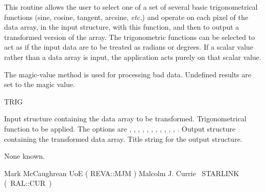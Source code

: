{
\begin{manroutinedescription}
  This routine allows the user to select one of a set of several
  basic trigonometrical functions (sine, cosine, tangent, arcsine,
  {\it etc.}) and operate on each pixel of the data array, in the input
  {} structure, with this function, and then to output a
  transformed version of the array. The trigonometric functions can
  be selected to act as if the input data are to be treated as
  radians or degrees. If a scalar value rather than a data array is
  input, the application acts purely on that scalar value.

  The magic-value method is used for processing bad data.  Undefined
  results are set to the magic value.

  TRIG

\begin{manparametertable}
  Input {} structure containing the data array to be
  transformed.
  Trigonometrical function to be applied.  The options are {},
  {}, {}, {}, {},
  {}, {}, {}, {},
  {}, {}, {}.
  Output {} structure containing the transformed data array.
  Title string for the output {} structure.
 \mbox{{}}
\end{manparametertable}
  None known.

  Mark McCaughrean UoE ( {\mantt REVA}::{\mantt MJM} )
  Malcolm J. Currie ~STARLINK \mbox{( {\mantt RAL}::{\mantt CUR} )}
\end{manroutinedescription}

 
 
}
